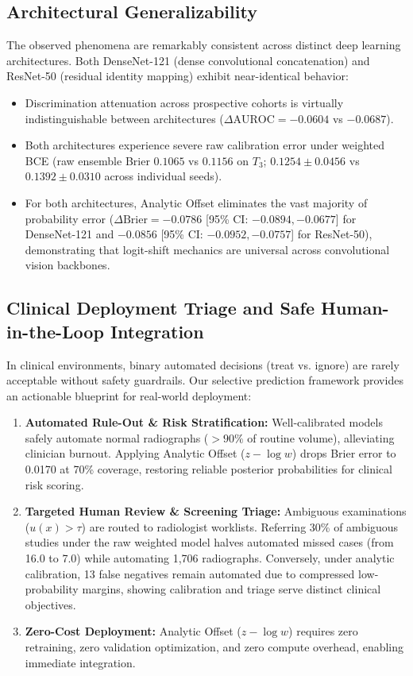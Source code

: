 \documentclass[journal]{IEEEtran}
\begin{document}
\subsection{Architectural Generalizability}
The observed phenomena are remarkably consistent across distinct deep learning architectures. Both DenseNet-121 (dense convolutional concatenation) and ResNet-50 (residual identity mapping) exhibit near-identical behavior:
\begin{itemize}
    \item Discrimination attenuation across prospective cohorts is virtually indistinguishable between architectures ($\Delta\text{AUROC} = -0.0604$ vs $-0.0687$).
    \item Both architectures experience severe raw calibration error under weighted BCE (raw ensemble Brier $0.1065$ vs $0.1156$ on $T_3$; $0.1254 \pm 0.0456$ vs $0.1392 \pm 0.0310$ across individual seeds).
    \item For both architectures, Analytic Offset eliminates the vast majority of probability error ($\Delta\text{Brier} = -0.0786$ [95\% CI: $-0.0894, -0.0677$] for DenseNet-121 and $-0.0856$ [95\% CI: $-0.0952, -0.0757$] for ResNet-50), demonstrating that logit-shift mechanics are universal across convolutional vision backbones.
\end{itemize}

\subsection{Clinical Deployment Triage and Safe Human-in-the-Loop Integration}
In clinical environments, binary automated decisions (treat vs. ignore) are rarely acceptable without safety guardrails. Our selective prediction framework provides an actionable blueprint for real-world deployment:
\begin{enumerate}
    \item \textbf{Automated Rule-Out \& Risk Stratification:} Well-calibrated models safely automate normal radiographs ($>90\%$ of routine volume), alleviating clinician burnout. Applying Analytic Offset ($z - \log w$) drops Brier error to 0.0170 at 70\% coverage, restoring reliable posterior probabilities for clinical risk scoring.
    \item \textbf{Targeted Human Review \& Screening Triage:} Ambiguous examinations ($u(x) > \tau$) are routed to radiologist worklists. Referring 30\% of ambiguous studies under the raw weighted model halves automated missed cases (from 16.0 to 7.0) while automating 1,706 radiographs. Conversely, under analytic calibration, 13 false negatives remain automated due to compressed low-probability margins, showing calibration and triage serve distinct clinical objectives.
    \item \textbf{Zero-Cost Deployment:} Analytic Offset ($z - \log w$) requires zero retraining, zero validation optimization, and zero compute overhead, enabling immediate integration.
\end{enumerate}
\end{document}
